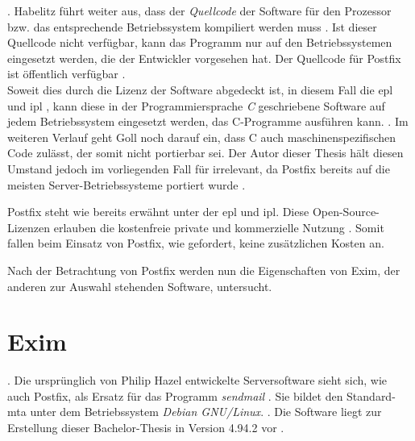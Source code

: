  \citep[][26]{Habelitz2016}.
Habelitz führt weiter aus, dass der \textit{Quellcode} der Software für den Prozessor bzw. das entsprechende Betriebssystem kompiliert werden muss \citep[vgl.][27]{Habelitz2016}. 
Ist dieser Quellcode nicht verfügbar, kann das Programm nur auf den Betriebssystemen eingesetzt werden, die der Entwickler vorgesehen hat. 
Der Quellcode für Postfix ist öffentlich verfügbar \citep[vgl.][]{postfixsource}.\\ 
Soweit dies durch die Lizenz der Software abgedeckt ist, in diesem Fall die \ac{epl} und \ac{ipl} \citep[vgl.][]{postfixsource}, kann diese in der Programmiersprache \textit{C} geschriebene Software auf jedem Betriebssystem eingesetzt werden, das C-Programme ausführen kann.
 \citep[][6]{Goll2014}. Im weiteren Verlauf geht Goll noch darauf ein, dass C auch maschinenspezifischen Code zulässt, der somit nicht portierbar sei. Der Autor dieser Thesis hält diesen Umstand jedoch im vorliegenden Fall für irrelevant, da Postfix bereits auf die meisten Server-Betriebssysteme portiert wurde \citep[vgl.][]{postfixpackages}.

Postfix steht wie bereits erwähnt unter der \ac{epl} und \ac{ipl}. Diese Open-Source-Lizenzen erlauben die kostenfreie private und kommerzielle Nutzung \citep[vgl.][]{postfixlizenz}. Somit fallen beim Einsatz von Postfix, wie gefordert, keine zusätzlichen Kosten an.

Nach der Betrachtung von Postfix werden nun die Eigenschaften von Exim, der anderen zur Auswahl stehenden Software, untersucht.

\section{Exim}

 \citep[][]{eximhome}. Die ursprünglich von Philip Hazel entwickelte Serversoftware sieht sich, wie auch Postfix, als Ersatz für das Programm \textit{sendmail} \citep[vgl.][]{eximhome}. Sie bildet den Standard-\ac{mta} unter dem Betriebssystem \textit{Debian GNU/Linux}.  \citep[][]{debianwiki}. Die Software liegt zur Erstellung dieser Bachelor-Thesis in Version 4.94.2 vor \citep[vgl.][]{eximgit}.

